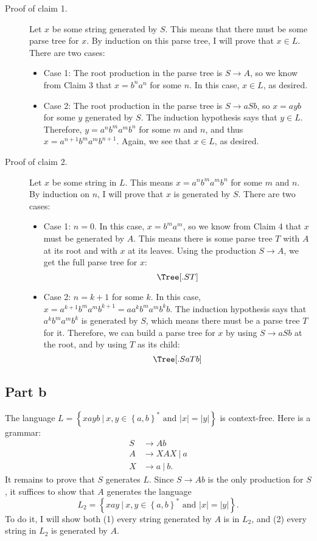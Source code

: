 \documentclass[12pt]{article}
\newcommand{\alt}{\ |\ }
\newcommand{\set}[1]{\left\{#1\right\}}
\newcommand{\Set}[2]{\set{#1\ |\ #2}}
\begin{document}
\begin{description}
      \item[Proof of claim 1.]
        Let $x$ be some string generated by $S$. This means that there must be some parse tree for $x$. By induction on this parse tree, I will prove that $x\in L$. There are two cases:
        \begin{itemize}
          \item
            Case 1: The root production in the parse tree is $S\to A$, so we know from Claim 3 that $x=b^na^n$ for some $n$. In this case, $x\in L$, as desired.
          \item
            Case 2: The root production in the parse tree is $S\to aSb$, so $x=ayb$ for some $y$ generated by $S$. The induction hypothesis says that $y\in L$. Therefore, $y=a^nb^ma^mb^n$ for some $m$ and $n$, and thus $x=a^{n+1}b^ma^mb^{n+1}$. Again, we see that $x\in L$, as desired.
        \end{itemize}
      \item[Proof of claim 2.]
        Let $x$ be some string in $L$. This means $x=a^nb^ma^mb^n$ for some $m$ and $n$. By induction on $n$, I will prove that $x$ is generated by $S$. There are two cases:
        \begin{itemize}
          \item
            Case 1: $n=0$. In this case, $x=b^ma^m$, so we know from Claim 4 that $x$ must be generated by $A$. This means there is some parse tree $T$ with $A$ at its root and with $x$ at its leaves. Using the production $S\to A$, we get the full parse tree for $x$:
            \[
              \Tree[.S T ]
            \]
          \item
            Case 2: $n=k+1$ for some $k$. In this case, $x=a^{k+1}b^ma^mb^{k+1}=aa^kb^ma^mb^kb$. The induction hypothesis says that $a^kb^ma^mb^k$ is generated by $S$, which means there must be a parse tree $T$ for it. Therefore, we can build a parse tree for $x$ by using $S\to aSb$ at the root, and by using $T$ as its child:
            \[
              \Tree[.S a T b ]
            \]
        \end{itemize}
    \end{description}
  \subsection{Part b}
    The language $L=\Set{xayb}{\text{$x,y\in\set{a,b}^*$ and $|x|=|y|$}}$ is context-free. Here is a grammar:
    \begin{align*}
      S &\to Ab \\
      A &\to XAX \alt a \\
      X &\to a \alt b.
    \end{align*}
    It remains to prove that $S$ generates $L$. Since $S\to Ab$ is the only production for $S$, it suffices to show that $A$ generates the language
    \[
      L_2=\Set{xay}{\text{$x,y\in\set{a,b}^*$ and $|x|=|y|$}}.
    \]
    To do it, I will show both (1) every string generated by $A$ is in $L_2$, and (2) every string in $L_2$ is generated by $A$.
\end{document}
